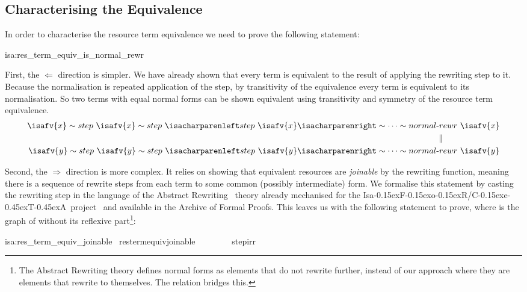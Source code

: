 \documentclass[class=smolathesis,crop=false]{standalone}
\begin{document}
\subsection{Characterising the Equivalence}
\label{sec:res/rewr/equivalence}

\newcommand\isafor{\textsf{Isa\kern-0.15exF\kern-0.15exo\kern-0.15exR}}
\newcommand\ceta{\textsf{C\kern-0.15exe\kern-0.45exT\kern-0.45exA}}

In order to characterise the resource term equivalence we need to prove the following statement:
\begin{isalemma}{isa:res_term_equiv_is_normal_rewr}
  
\end{isalemma}

First, the $\Longleftarrow$ direction is simpler.
We have already shown that every term is equivalent to the result of applying the rewriting step to it.
Because the normalisation is repeated application of the step, by transitivity of the equivalence every term is equivalent to its normalisation.
So two terms with equal normal forms can be shown equivalent using transitivity and symmetry of the resource term equivalence.
\begin{align*}
  \isafv{x} \sim step\ \isafv{x} \sim step\ \isapars{step\ \isafv{x}} \sim \dots \sim normal&{\mbox{-}}rewr\ \isafv{x}\\
  &\parallel\\
  \isafv{y} \sim step\ \isafv{y} \sim step\ \isapars{step\ \isafv{y}}  \sim \dots \sim normal&{\mbox{-}}rewr\ \isafv{y}
\end{align*}

Second, the $\Longrightarrow$ direction is more complex.
It relies on showing that equivalent resources are \emph{joinable} by the rewriting function, meaning there is a sequence of rewrite steps from each term to some common (possibly intermediate) form.
We formalise this statement by casting the rewriting step in the language of the Abstract Rewriting~\cite{Abstract-Rewriting-AFP} theory already mechanised for the \isafor/\ceta\ project~\cite{thiemann_sternagel-2009} and available in the Archive of Formal Proofs.
\cbstart
This leaves us with the following statement to prove, where  is the graph of  without its reflexive part\footnote{The Abstract Rewriting theory defines normal forms as elements that do not rewrite further, instead of our approach where they are elements that rewrite to themselves. The  relation bridges this.}:
\begin{isalemma}{isa:res_term_equiv_joinable}
  \ res{\isacharunderscore}term{\isacharunderscore}equiv{\isacharunderscore}joinable{\isacharcolon}\isanewline
  \ \ \ \isasymsim\ \ \isasymLongrightarrow\ \ \isasymin\ step{\isacharunderscore}irr\isactrlsup{\isasymdown}
\end{isalemma}
\end{document}
